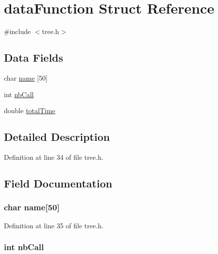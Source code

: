\hypertarget{structdata_function}{\section{data\-Function Struct Reference}
\label{structdata_function}
}


{\ttfamily \#include $<$tree.\-h$>$}

\subsection*{Data Fields}
\begin{DoxyCompactItemize}
\item 
char \hyperlink{structdata_function_ae5cb967283dbbdf75cb2032c1fa08fee}{name} \mbox{[}50\mbox{]}
\item 
int \hyperlink{structdata_function_ad002fb454777606d0c604bf792d2aaa7}{nb\-Call}
\item 
double \hyperlink{structdata_function_ae15a5fb5647ad685d2d5bde7fcfaa93a}{total\-Time}
\end{DoxyCompactItemize}


\subsection{Detailed Description}


Definition at line 34 of file tree.\-h.



\subsection{Field Documentation}
\hypertarget{structdata_function_ae5cb967283dbbdf75cb2032c1fa08fee}{
\subsubsection[{name}]{\setlength{\rightskip}{0pt plus 5cm}char name\mbox{[}50\mbox{]}}}\label{structdata_function_ae5cb967283dbbdf75cb2032c1fa08fee}


Definition at line 35 of file tree.\-h.

\hypertarget{structdata_function_ad002fb454777606d0c604bf792d2aaa7}{
\subsubsection[{nb\-Call}]{\setlength{\rightskip}{0pt plus 5cm}int nb\-Call}}\label{structdata_function_ad002fb454777606d0c604bf792d2aaa7}


